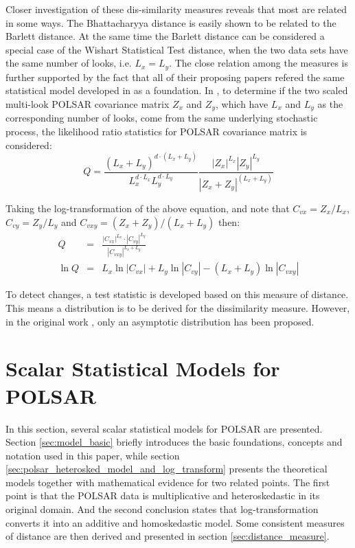 \documentclass[journal]{IEEEtran}
\begin{document}


Closer investigation of these dis-similarity measures reveals that most are related in some ways. %
The Bhattacharyya distance is easily shown to be related to the Barlett distance.
At the same time the Barlett distance can be considered a special case of the Wishart Statistical Test distance,
  when the two data sets have the same number of looks, i.e. $L_x=L_y$.
The close relation among the measures is further supported by the fact that
  all of their proposing papers refered the same statistical model developed in \cite{Conradsen_2003_TGRS_4} as a foundation.
In \cite{Conradsen_2003_TGRS_4}, to determine if the two scaled multi-look POLSAR covariance matrix $Z_x$ and $Z_y$,
  which have $L_x$ and $L_y$ as the corresponding number of looks,
  come from the same underlying stochastic process,
the likelihood ratio statistics for POLSAR covariance matrix is considered:  
\begin{equation*}
  Q = \frac{(L_x+L_y)^{d \cdot (L_x+L_y)}}{L_x^{d \cdot L_x} L_y^{d \cdot L_y}} \frac{|Z_x|^{L_x} |Z_y|^{L_y} }{|Z_x+Z_y|^{(L_x+L_y)}}
\end{equation*}

Taking the log-transformation of the above equation, and note that $C_{vx} = Z_x / L_x$, $C_{vy} = Z_y / L_y$ and $C_{vxy} = (Z_x + Z_y)/(L_x + L_y)$ then:
\begin{eqnarray}
  Q &=& \frac{|C_{vx}|^{L_x} \cdot |C_{vy}|^{L_y} }{|C_{vxy}|^{L_x + L_y}} \label{eqn:ori_likelyhood_stats} \\
  \ln Q &=& L_x \ln |C_{vx}| + L_y \ln |C_{vy}| - (L_x + L_y) \ln |C_{vxy}| \label{eqn:log_likelyhood_stats}
\end{eqnarray}

To detect changes, a test statistic is developed based on this measure of distance.
This means a distribution is to be derived for the dissimilarity measure.
However, in the original work \cite{Conradsen_2003_TGRS_4}, only an asymptotic distribution has been proposed.

\section{Scalar Statistical Models for POLSAR}  
\label{sec:theoretical_model}

In this section, several scalar statistical models for POLSAR are presented.
Section \ref{sec:model_basic} briefly introduces the basic foundations, concepts and notation used in this paper, %
  while section \ref{sec:polsar_heterosked_model_and_log_transform}
  presents the theoretical models together with mathematical evidence for two related points.
The first point is that the POLSAR data is multiplicative and heteroskedastic in its original domain.
And the second conclusion states that log-transformation converts it into an additive and homoskedastic model.
Some consistent measures of distance are then derived and presented in section \ref{sec:distance_measure}.
\end{document}
